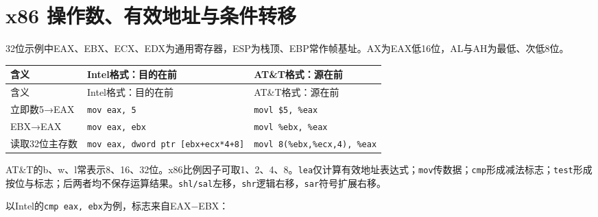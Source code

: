 \section{x86 操作数、有效地址与条件转移}\label{CO04-x86}

32位示例中EAX、EBX、ECX、EDX为通用寄存器，ESP为栈顶、EBP常作帧基址。AX为EAX低16位，AL与AH为最低、次低8位。

\par\smallskip
{\fontsize{9.3}{12}\selectfont\setlength{\tabcolsep}{2.5pt}\setlength{\LTleft}{0pt}\setlength{\LTright}{0pt}
\begin{longtable}{@{}>{\raggedright\arraybackslash}p{}>{\raggedright\arraybackslash}p{}>{\raggedright\arraybackslash}p{}@{}}
\toprule
含义 & Intel格式：目的在前 & AT\&T格式：源在前 \\

\midrule\endfirsthead\toprule
含义 & Intel格式：目的在前 & AT\&T格式：源在前 \\

\midrule\endhead\bottomrule\endfoot
立即数5→EAX & \texttt{mov\ eax,\ 5} & \texttt{movl\ \$5,\ \%eax} \\

EBX→EAX & \texttt{mov\ eax,\ ebx} & \texttt{movl\ \%ebx,\ \%eax} \\

读取32位主存数 & \texttt{mov\ eax,\ dword\ ptr\ {[}ebx+ecx*4+8{]}} & \texttt{movl\ 8(\%ebx,\%ecx,4),\ \%eax} \\

\end{longtable}}
\par\smallskip

AT\&T的b、w、l常表示8、16、32位。x86比例因子可取1、2、4、8。\texttt{lea}仅计算有效地址表达式；\texttt{mov}传数据；\texttt{cmp}形成减法标志；\texttt{test}形成按位与标志；后两者均不保存运算结果。\texttt{shl/\allowbreak{}sal}左移，\texttt{shr}逻辑右移，\texttt{sar}符号扩展右移。

以Intel的\texttt{cmp eax,\allowbreak{} ebx}为例，标志来自EAX\ensuremath{-}EBX：

